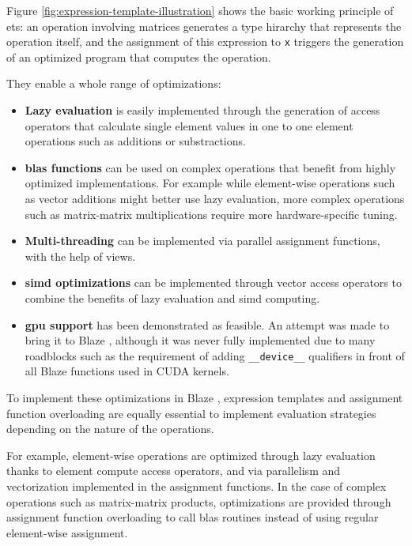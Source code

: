 \documentclass[../main]{subfiles}
\begin{document}
Figure \ref{fig:expression-template-illustration} shows the basic
working principle of \glspl{et}: an operation involving matrices generates
a type hirarchy that represents the operation itself, and the assignment
of this expression to \lstinline{x} triggers the generation of
an optimized program that computes the operation.

They enable a whole range of optimizations:

\begin{itemize}

\item
\textbf{Lazy evaluation} is easily implemented through the generation
of access operators that calculate single element values in one to one
element operations such as additions or substractions.

\item
\textbf{\gls{blas} functions} can be used on complex operations that
benefit from highly optimized implementations. For example while
element-wise operations such as vector additions might better use
lazy evaluation, more complex operations such as matrix-matrix multiplications
require more hardware-specific tuning.

\item
\textbf{Multi-threading} can be implemented via parallel assignment functions,
with the help of views.

\item
\textbf{\gls{simd} optimizations} can be implemented through vector access
operators to combine the benefits of lazy evaluation and \gls{simd} computing.

\item
\textbf{\gls{gpu} support} has been demonstrated as feasible.
An attempt was made to bring it to Blaze \cite{blaze_cuda},
although it was never fully implemented due to many roadblocks such as
the requirement of adding \lstinline{__device__} qualifiers in front of
all Blaze functions used in CUDA kernels.

\end{itemize}

To implement these optimizations in Blaze \cite{blazelib},
expression templates and assignment function overloading are equally essential
to implement evaluation strategies depending on the nature of the operations.

For example, element-wise operations are optimized through lazy evaluation
thanks to element compute access operators, and via parallelism
and vectorization implemented in the assignment functions.
In the case of complex operations such as matrix-matrix products,
optimizations are provided through assignment function overloading
to call \gls{blas} routines instead of using regular element-wise assignment.
\\
\end{document}
